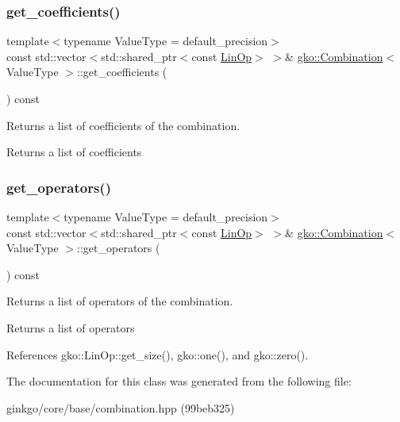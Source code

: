 \subsubsection{\texorpdfstring{get\+\_\+coefficients()}{get\_coefficients()}}
{\footnotesize\ttfamily template$<$typename Value\+Type  = default\+\_\+precision$>$ \\
const std\+::vector$<$std\+::shared\+\_\+ptr$<$const \hyperlink{classgko_1_1LinOp}{Lin\+Op}$>$ $>$\& \hyperlink{classgko_1_1Combination}{gko\+::\+Combination}$<$ Value\+Type $>$\+::get\+\_\+coefficients (\begin{DoxyParamCaption}{ }\end{DoxyParamCaption}) const\hspace{0.3cm}{\ttfamily [noexcept]}}



Returns a list of coefficients of the combination. 

\begin{DoxyReturn}{Returns}
a list of coefficients 
\end{DoxyReturn}
\mbox{\label{classgko_1_1Combination_a75a81c2b91441ddea98949ef54f62441}} 
\subsubsection{\texorpdfstring{get\+\_\+operators()}{get\_operators()}}
{\footnotesize\ttfamily template$<$typename Value\+Type  = default\+\_\+precision$>$ \\
const std\+::vector$<$std\+::shared\+\_\+ptr$<$const \hyperlink{classgko_1_1LinOp}{Lin\+Op}$>$ $>$\& \hyperlink{classgko_1_1Combination}{gko\+::\+Combination}$<$ Value\+Type $>$\+::get\+\_\+operators (\begin{DoxyParamCaption}{ }\end{DoxyParamCaption}) const\hspace{0.3cm}{\ttfamily [noexcept]}}



Returns a list of operators of the combination. 

\begin{DoxyReturn}{Returns}
a list of operators 
\end{DoxyReturn}


References gko\+::\+Lin\+Op\+::get\+\_\+size(), gko\+::one(), and gko\+::zero().



The documentation for this class was generated from the following file\+:\begin{DoxyCompactItemize}
\item 
ginkgo/core/base/combination.\+hpp (99beb325)\end{DoxyCompactItemize}
